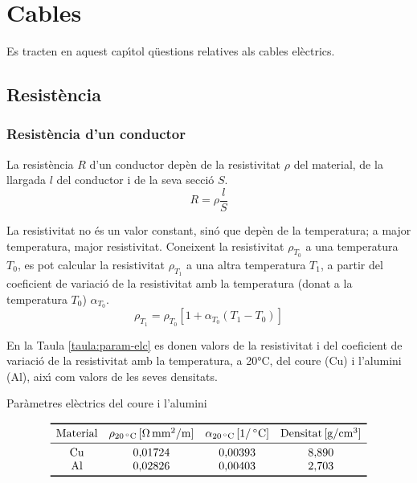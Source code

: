 \chapter{Cables}

Es tracten en aquest cap\'{\i}tol q\"{u}estions relatives als cables el\`{e}ctrics.

\section{Resist\`{e}ncia}

\subsection{Resist\`{e}ncia d'un conductor}

La resist\`{e}ncia $R$ d'un conductor dep\`{e}n de la resistivitat $\rho$
del material, de la llargada $l$ del conductor i de la seva secci\'{o}
$S$.
\begin{equation}
   R= \rho \frac{l}{S}
\end{equation}
\index{$\rho$}

La resistivitat no
\'{e}s un valor constant, sin\'{o} que dep\`{e}n de la temperatura; a major
temperatura, major resistivitat. Coneixent la resistivitat $\rho_{T_0}$ a una
temperatura $T_0$, es pot calcular la resistivitat $\rho_{T_1}$ a una altra
temperatura $T_1$, a partir del coeficient de variaci\'{o} de la
resistivitat amb la temperatura (donat a la temperatura $T_0$)
$\alpha_{T_0}$.
\begin{equation}
   \rho_{T_1} = \rho_{T_0} [1 + \alpha_{T_0} (T_1 - T_0)]
\end{equation}
\index{$\alpha$}

En la Taula
\vref{taula:param-elc} es donen valors de la resistivitat i del
coeficient de variaci\'{o} de la resistivitat amb la temperatura, a
20\unit{\celsius}, del coure (Cu) i l'alumini (Al), aix\'{\i} com valors
de les seves densitats.
\begin{table}[htb]
   \caption{\label{taula:param-elc} Par\`{a}metres el\`{e}ctrics del coure i l'alumini}
   \[ \begin{array}{cccc}
   \toprule[1pt]
   \text{Material} & \rho_{20\unit{\celsius}}\unit{[\ohm\,mm^2/m]} & \alpha_{20\unit{\celsius}}\unit{[1/\,\celsius]} & \text{Densitat}\unit{[g/cm^3] }
   \\
   \midrule
   \text{Cu} & 0{,}01724 & 0{,}00393 & 8{,}890 \\
   \text{Al} & 0{,}02826 & 0{,}00403 & 2{,}703 \\
   \bottomrule[1pt]
   \end{array}   \]
\end{table}

